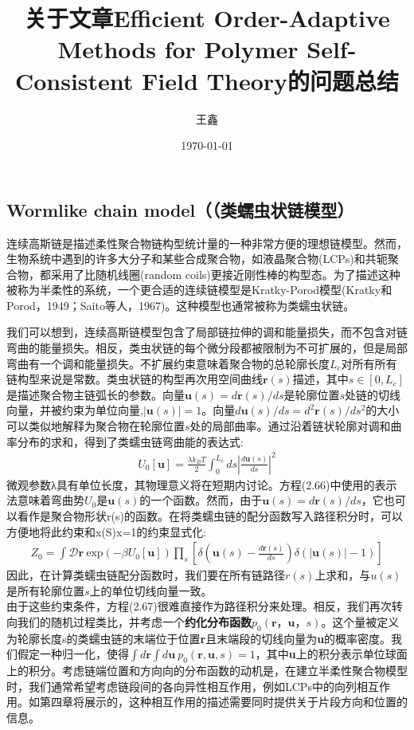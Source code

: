 \documentclass[12pt]{article}
\begin{document}
	\begin{CJK}{UTF8}{gkai}
		\title{关于文章Efficient Order-Adaptive Methods for Polymer Self-Consistent Field
			Theory的问题总结}
		\date{\today}
		\author{王鑫}
\section{Wormlike chain model（（类蠕虫状链模型）}

\qquad 连续高斯链是描述柔性聚合物链构型统计量的一种非常方便的理想链模型。然而，生物系统中遇到的许多大分子和某些合成聚合物，如液晶聚合物(LCPs)和共轭聚合物，都采用了比随机线圈(random coils)更接近刚性棒的构型态。为了描述这种被称为半柔性的系统，一个更合适的连续链模型是Kratky-Porod模型(Kratky和Porod，1949；Saito等人，1967)。这种模型也通常被称为类蠕虫状链。

我们可以想到，连续高斯链模型包含了局部链拉伸的调和能量损失，而不包含对链弯曲的能量损失。相反，类虫状链的每个微分段都被限制为不可扩展的，但是局部弯曲有一个调和能量损失。不扩展约束意味着聚合物的总轮廓长度$L_c$对所有所有链构型来说是常数。类虫状链的构型再次用空间曲线$\textbf{r}(s)$描述，其中$s\in [0,L_c]$是描述聚合物主链弧长的参数。向量$\textbf{u}(s)=d\textbf{r}(s)/ds$是轮廓位置$s$处链的切线向量，并被约束为单位向量,$|\textbf{u}(s)| =1$。向量$d\textbf{u}(s)/ds=d^2\textbf{r}(s)/ds^2$的大小可以类似地解释为聚合物在轮廓位置$s$处的局部曲率。通过沿着链状轮廓对调和曲率分布的求和，得到了类蠕虫链弯曲能的表达式:\\
\begin{gather}
U_0[\textbf{u}]=\frac{\lambda k_B T}{2}\int_{0}^{L_c}ds|\frac{d\textbf{u}(s)}{ds}|^2
\end{gather}
微观参数λ具有单位长度，其物理意义将在短期内讨论。方程(2.66)中使用的表示法意味着弯曲势$U_0$是$\textbf{u}(s)$的一个函数。然而，由于$\textbf{u}(s)=d\textbf{r}(s)/ds$，它也可以看作是聚合物形状r(s)的函数。在将类蠕虫链的配分函数写入路径积分时，可以方便地将此约束和x(S)x=1的约束显式化:\\
\begin{gather}
Z_0=\int \mathcal{D} \textbf{r}\ \mathrm{exp}(-\beta U_0[\textbf{u}])\prod_s\left[\delta\left(\textbf{u}(s)-\frac{d\textbf{r}(s)}{ds}\right)\delta(|\textbf{u}(s)|-1)\right]
\end{gather}
因此，在计算类蠕虫链配分函数时，我们要在所有链路径$r(s)$上求和，与$u(s)$是所有轮廓位置$s$上的单位切线向量一致。\\

由于这些约束条件，方程(2.67)很难直接作为路径积分来处理。相反，我们再次转向我们的随机过程类比，并考虑一个\textbf{约化分布函数}$p_0(\textbf{r}，\textbf{u}，s)$。这个量被定义为轮廓长度s的类蠕虫链的末端位于位置\textbf{r}且末端段的切线向量为\textbf{u}的概率密度。我们假定一种归一化，使得$\int d\textbf{r}\int d\textbf{u} \ p_0(\textbf{r},\textbf{u},s)=1$，其中\textbf{u}上的积分表示单位球面上的积分。考虑链端位置和方向向的分布函数的动机是，在建立半柔性聚合物模型时，我们通常希望考虑链段间的各向异性相互作用，例如LCPs中的向列相互作用。如第四章将展示的，这种相互作用的描述需要同时提供关于片段方向和位置的信息。


\end{CJK}
\end{document}
